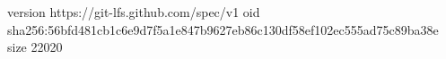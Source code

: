 version https://git-lfs.github.com/spec/v1
oid sha256:56bfd481cb1c6e9d7f5a1e847b9627eb86c130df58ef102ec555ad75c89ba38e
size 22020
